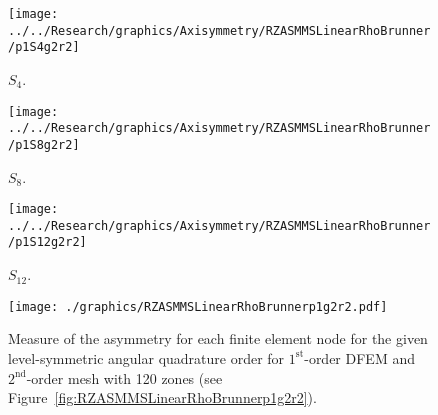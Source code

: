 \documentclass[12pt,letterpaper]{article}
\begin{document}
\begin{sidewaysfigure}[!htb]
\centering
\begin{subfigure}{0.33\textwidth}
\texttt{[image: ../../Research/graphics/Axisymmetry/RZASMMSLinearRhoBrunner/p1S4g2r2]}
\caption{$S_4$.}
\end{subfigure}%
\begin{subfigure}{0.33\textwidth}
\texttt{[image: ../../Research/graphics/Axisymmetry/RZASMMSLinearRhoBrunner/p1S8g2r2]}
\caption{$S_8$.}
\end{subfigure}%
\begin{subfigure}{0.33\textwidth}
\texttt{[image: ../../Research/graphics/Axisymmetry/RZASMMSLinearRhoBrunner/p1S12g2r2]}
\caption{$S_{12}$.}
\end{subfigure}
\caption{Relative asymmetry for $1^\text{st}$-order finite elements on a $2^\text{nd}$-order mesh for given order of level-symmetric angular quadrature.}
\label{fig:RZASMMSLinearRhoBrunnerp1g2r2}
\end{sidewaysfigure}

\begin{figure}[!htb]
\centering
\texttt{[image: ./graphics/RZASMMSLinearRhoBrunnerp1g2r2.pdf]}
\caption{Measure of the asymmetry for each finite element node for the given level-symmetric angular quadrature order for $1^\text{st}$-order DFEM and $2^\text{nd}$-order mesh with 120 zones (see Figure~\ref{fig:RZASMMSLinearRhoBrunnerp1g2r2}).}
\label{fig:RZASMMSLinearRhoBrunnerp1g2r2Nodes}
\end{figure}
\end{document}
